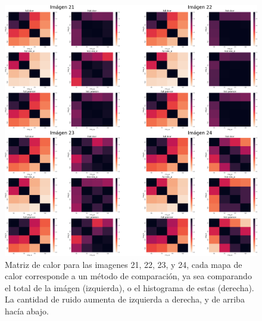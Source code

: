 \begin{figure}
    \centering
    \includegraphics[width=\textwidth]{figuras/heatmaps/heatmaps_app_5.png}
    \caption{Matriz de calor para las imagenes 21, 22, 23, y 24, cada mapa de calor corresponde a un m\'etodo de comparaci\'on, ya sea comparando el total de la im\'agen (izquierda), o el histograma de estas (derecha). La cantidad de ruido aumenta de izquierda a derecha, y de arriba hacía abajo.}
\end{figure}




